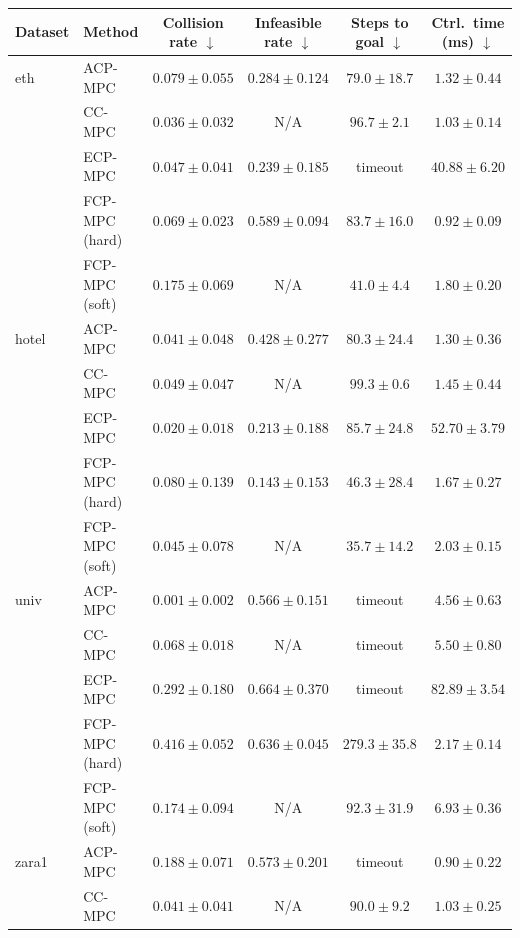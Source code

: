 \begin{tabular}{llcccc}
\hline
Dataset & Method & Collision rate $\downarrow$ & Infeasible rate $\downarrow$ & Steps to goal $\downarrow$ & Ctrl.\ time (ms) $\downarrow$ \\
\hline
eth & ACP-MPC~\cite{dixit2023adaptive} & $0.079\pm0.055$ & $0.284\pm0.124$ & $79.0\pm18.7$ & $1.32\pm0.44$ \\
 & CC-MPC~\cite{lekeufack2024decision} & $\mathbf{0.036}\pm0.032$ & N/A & $96.7\pm2.1$ & $1.03\pm0.14$ \\
 & ECP-MPC~\cite{shin2025egocentric} & $0.047\pm0.041$ & $\mathbf{0.239}\pm0.185$ & timeout & $40.88\pm6.20$ \\
 & FCP-MPC (hard) & $0.069\pm0.023$ & $0.589\pm0.094$ & $83.7\pm16.0$ & $\mathbf{0.92}\pm0.09$ \\
 & FCP-MPC (soft) & $0.175\pm0.069$ & N/A & $\mathbf{41.0}\pm4.4$ & $1.80\pm0.20$ \\
\hline
hotel & ACP-MPC~\cite{dixit2023adaptive} & $0.041\pm0.048$ & $0.428\pm0.277$ & $80.3\pm24.4$ & $\mathbf{1.30}\pm0.36$ \\
 & CC-MPC~\cite{lekeufack2024decision} & $0.049\pm0.047$ & N/A & $99.3\pm0.6$ & $1.45\pm0.44$ \\
 & ECP-MPC~\cite{shin2025egocentric} & $\mathbf{0.020}\pm0.018$ & $0.213\pm0.188$ & $85.7\pm24.8$ & $52.70\pm3.79$ \\
 & FCP-MPC (hard) & $0.080\pm0.139$ & $\mathbf{0.143}\pm0.153$ & $46.3\pm28.4$ & $1.67\pm0.27$ \\
 & FCP-MPC (soft) & $0.045\pm0.078$ & N/A & $\mathbf{35.7}\pm14.2$ & $2.03\pm0.15$ \\
\hline
univ & ACP-MPC~\cite{dixit2023adaptive} & $\mathbf{0.001}\pm0.002$ & $\mathbf{0.566}\pm0.151$ & timeout & $4.56\pm0.63$ \\
 & CC-MPC~\cite{lekeufack2024decision} & $0.068\pm0.018$ & N/A & timeout & $5.50\pm0.80$ \\
 & ECP-MPC~\cite{shin2025egocentric} & $0.292\pm0.180$ & $0.664\pm0.370$ & timeout & $82.89\pm3.54$ \\
 & FCP-MPC (hard) & $0.416\pm0.052$ & $0.636\pm0.045$ & $279.3\pm35.8$ & $\mathbf{2.17}\pm0.14$ \\
 & FCP-MPC (soft) & $0.174\pm0.094$ & N/A & $\mathbf{92.3}\pm31.9$ & $6.93\pm0.36$ \\
\hline
zara1 & ACP-MPC~\cite{dixit2023adaptive} & $0.188\pm0.071$ & $0.573\pm0.201$ & timeout & $\mathbf{0.90}\pm0.22$ \\
 & CC-MPC~\cite{lekeufack2024decision} & $\mathbf{0.041}\pm0.041$ & N/A & $90.0\pm9.2$ & $1.03\pm0.25$ \\

\end{tabular}
